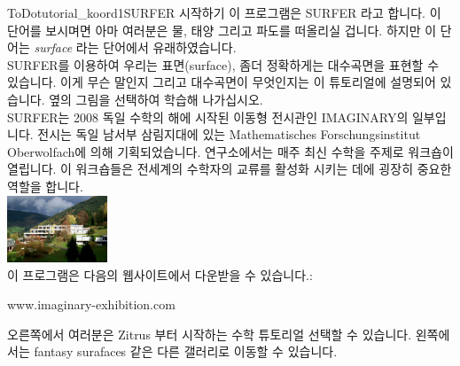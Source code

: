 \begin{surferIntroPage}{ToDo}{tutorial_koord1}{SURFER 시작하기}
이 프로그램은 SURFER 라고 합니다. 이 단어를 보시며면 아마 여러분은 물, 태양 그리고 파도를 떠올리실 겁니다. 하지만 이 단어는 {\it surface} 라는 단어에서 유래하였습니다.
\\
SURFER를 이용하여 우리는 표면(surface), 좀더 정확하게는 대수곡면을 표현할 수 있습니다. 이게 무슨 말인지 그리고 대수곡면이 무엇인지는 이 튜토리얼에 설명되어 있습니다. 옆의 그림을 선택하여 학습해 나가십시오.\\
SURFER는 2008 독일 수학의 해에 시작된 이동형 전시관인 IMAGINARY의 일부입니다. 전시는 독일 남서부 삼림지대에 있는 Mathematisches Forschungsinstitut Oberwolfach에 의해 기획되었습니다. 연구소에서는 매주 최신 수학을 주제로 워크숍이 열립니다. 이 워크숍들은 전세계의 수학자의 교류를 활성화 시키는 데에 굉장히 중요한 역할을 합니다.\\
\vspace{0.2cm} \hspace{3.5cm}\includegraphics[width=3cm]{./../../common/images/photo_mfo.jpg}\\
이 프로그램은 다음의 웹사이트에서 다운받을 수 있습니다.: \\
\begin{centering}
www.imaginary-exhibition.com\\
\end{centering}
 \vspace{0.2cm}
오른쪽에서 여러분은 Zitrus 부터 시작하는 수학 튜토리얼 선택할 수 있습니다. 왼쪽에서는 fantasy surafaces 같은 다른 갤러리로 이동할 수 있습니다.
\end{surferIntroPage}
